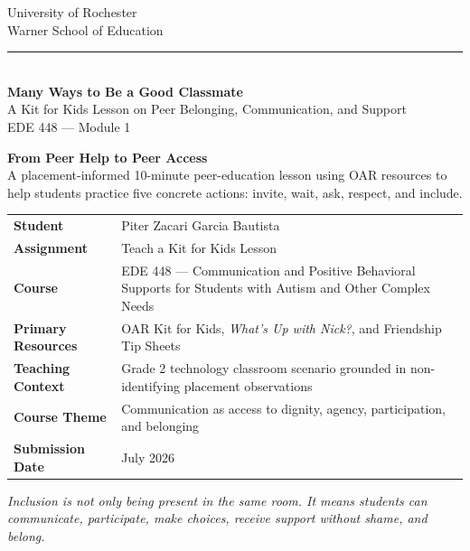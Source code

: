 \begin{titlepage}
\thispagestyle{empty}
\begin{center}
{\large University of Rochester\\}
{\normalsize Warner School of Education\\[0.18in]}
{\color{PrimaryRed}\rule{\textwidth}{1.4pt}}\\[0.18in]
{\Huge\bfseries Many Ways to Be a Good Classmate}\\[0.18in]
{\LARGE A Kit for Kids Lesson on Peer Belonging, Communication, and Support}\\[0.22in]
{\Large EDE 448 --- Module 1}\\[0.35in]
\colorbox{SoftBlue}{\parbox{0.88\textwidth}{\centering\normalsize\textbf{From Peer Help to Peer Access}\\[0.07in]A placement-informed 10-minute peer-education lesson using OAR resources to help students practice five concrete actions: invite, wait, ask, respect, and include.}}
\end{center}
\vfill
\renewcommand{\arraystretch}{1.25}
\begin{center}
\begin{tabular}{>{\bfseries\RaggedLeft\arraybackslash}p{1.75in} >{\RaggedRight\arraybackslash}p{4.9in}}
Student & Piter Zacari Garcia Bautista \\
Assignment & Teach a Kit for Kids Lesson \\
Course & EDE 448 --- Communication and Positive Behavioral Supports for Students with Autism and Other Complex Needs \\
Primary Resources & OAR Kit for Kids, \textit{What's Up with Nick?}, and Friendship Tip Sheets \\
Teaching Context & Grade 2 technology classroom scenario grounded in non-identifying placement observations \\
Course Theme & Communication as access to dignity, agency, participation, and belonging \\
Submission Date & July 2026 \\
\end{tabular}
\end{center}
\vfill
\begin{center}
\begin{minipage}{0.9\textwidth}
\centering\large\itshape Inclusion is not only being present in the same room. It means students can communicate, participate, make choices, receive support without shame, and belong.
\end{minipage}
\end{center}
\end{titlepage}
